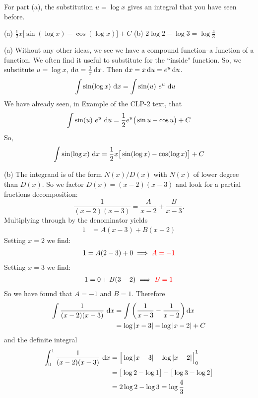 \begin{hint}
For part (a), the substitution $u=\log x$ gives an integral that you
have seen before.
\end{hint}

\begin{answer} (a)
$\displaystyle \frac{1}{2} x \big[\sin(\log x) -\cos(\log x)\big]+C $
\qquad (b)
$2\log 2 -\log 3 = \log\frac{4}{3}$
\end{answer}

\begin{solution} (a) Without any other ideas, we see we have a compound function--a function of a function. We often find it useful to substitute for the ``inside" function. So, we
substitute $u=\log x$, $\mathrm{d}u=\frac{1}{x}\,\mathrm{d}x$. Then
$\mathrm{d}x = x\,\mathrm{d}u= e^u\,\mathrm{d}u$.
\begin{align*}
\int\sin(\log x) \ \mathrm{d}x
&=\int\sin(u)\ e^u\ \mathrm{d}u
\end{align*}
We have already seen, in Example  of
the CLP-2 text, that
\begin{equation*}
\int\sin(u)\ e^u\ \mathrm{d}u
=\frac{1}{2}e^u\big(\sin u -\cos u\big)+C
\end{equation*}
So,
\begin{equation*}
\int\sin(\log x)\ \mathrm{d}x =\frac{1}{2} x \big[\sin(\log x) -\cos(\log x)\big]+C
\end{equation*}


\noindent (b)
The integrand is of the form $N(x)/D(x)$ with $N(x)$ of lower degree
than $D(x)$. So we factor $D(x)=(x-2)(x-3)$ and look for a partial fractions decomposition:
\begin{equation*}
\frac{1}{(x-2)(x-3)} = \frac{A}{x-2} + \frac{B}{x-3}.
\end{equation*}
Multiplying through by the denominator yields
\begin{align*}
1 &= A(x-3) + B(x-2)
\end{align*}
Setting $x=2$ we find:
\begin{align*}
   1 = A(2-3) + 0 \implies\color{red}  A = -1
\end{align*}
Setting $x=3$ we find:
\begin{align*}
   1 = 0 + B(3-2) \implies \color{red} B = 1
\end{align*}
So we have found that $A=-1$ and $B=1$. Therefore
\begin{align*}
  \int\frac{1}{(x-2)(x-3)}\ \mathrm{d}x
  &= \int \bigg( \frac{1}{x-3} - \frac{1}{x-2} \bigg) \,\mathrm{d}x \\
   &=  \log |x-3| -  \log|x-2| + C
\end{align*}
and the definite integral
\begin{align*}
  \int_0^1\frac{1}{(x-2)(x-3)}\ \mathrm{d}x
   &=  \Big[\log |x-3| -  \log|x-2|\Big]_0^1 \\
   &=  \big[\log 2 -  \log 1\big]-\big[\log 3 - \log 2\big]  \\
   &= 2\log 2 -\log 3 = \log\frac{4}{3}
\end{align*}


\end{solution}




